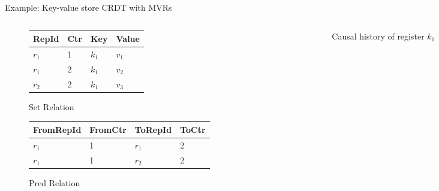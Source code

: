 \documentclass[USenglish,aspectratio=169]{beamer} %
\newcommand{\setop}[5][set]{$\mathit{#1}_{#2}^{#3} (#4, #5)$}
\begin{document}
\begin{frame}{Example: Key-value store \acs{CRDT} with \aclp{MVR}}
    \begin{columns}
        \begin{column}{0.5\textwidth}
            \begin{figure}
                \centering
                \begin{tabular}{@{}llll@{}}
                    \toprule
                    RepId   & Ctr    & Key     & Value   \\
                    \midrule
                    \(r_1\) & 1      & \(k_1\) & \(v_1\) \\
                    \(r_1\) & 2      & \(k_1\) & \(v_2\) \\
                    \(r_2\) & 2      & \(k_1\) & \(v_3\) \\
                    \bottomrule
                \end{tabular}
                \caption{Set Relation}
            \end{figure}
            \begin{figure}
                \centering
                \begin{tabular}{@{}llll@{}}
                    \toprule
                    FromRepId & FromCtr & ToRepId & ToCtr  \\
                    \midrule
                    \(r_1\)   & 1       & \(r_1\) & 2      \\
                    \(r_1\)   & 1       & \(r_2\) & 2      \\
                    \bottomrule
                \end{tabular}
                \caption{Pred Relation}
            \end{figure}
        \end{column}
        \pause
        \begin{column}{0.5\textwidth}
            \begin{figure}
                \centering
                \caption{Causal history of register \(k_1\)}\label{fig:causal-history-k1}
            \end{figure}
        \end{column}
    \end{columns}
\end{frame}
\end{document}
